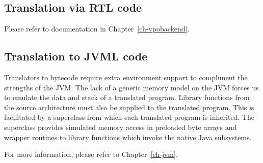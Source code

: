\subsection{Translation via RTL code} 
Please refer to documentation in Chapter~\ref{ch-vpobackend}. 


\subsection{Translation to JVML code}

Translators to bytecode require extra environment support
to compliment the strengths of the JVM.  The lack of a generic memory
model on the JVM forces us to emulate the data and stack of a translated
program.  Library functions from the source architecture must also be
supplied to the translated program.  This is facilitated by a superclass
from which each translated program is inherited.  The superclass provides
simulated memory access in preloaded byte arrays and wrapper routines to 
library functions which invoke the native Java subsystems.

For more information, please refer to Chapter~\ref{ch-jvm}. 


